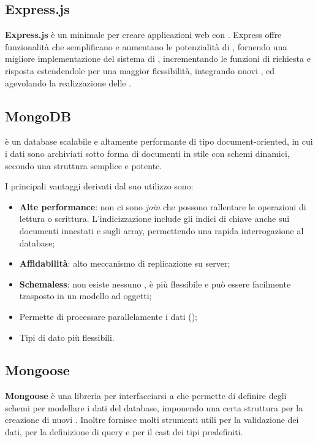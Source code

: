 \subsection{Express.js}
\textbf{Express.js} è un  minimale per creare applicazioni web con . 
Express offre funzionalità che semplificano e aumentano le potenzialità di , fornendo una migliore implementazione del sistema di , incrementando le funzioni di richiesta e risposta estendendole per una maggior flessibilità, integrando nuovi , ed agevolando la realizzazione delle . 

\subsection{MongoDB}
 è un database   scalabile e altamente performante di tipo document-oriented, in cui i dati sono archiviati sotto forma di documenti in stile  con schemi dinamici, secondo una struttura semplice e potente.

I principali vantaggi derivati dal suo utilizzo sono:
\begin{itemize}
	\item \textbf{Alte performance}: non ci sono \emph{join} che possono rallentare le operazioni di lettura o scrittura. L'indicizzazione include gli indici di chiave anche sui documenti innestati e sugli array, permettendo una rapida interrogazione al database;
	\item \textbf{Affidabilità}: alto meccanismo di replicazione su server;
	\item \textbf{Schemaless}: non esiste nessuno , è più flessibile e può essere facilmente trasposto in un modello ad oggetti;
	\item Permette di processare parallelamente i dati ();
	\item Tipi di dato più flessibili.
\end{itemize}

\subsection{Mongoose}
\textbf{Mongoose} è una libreria per interfacciarsi a  che permette di definire degli schemi per modellare i dati del database, imponendo una certa struttura per la creazione di nuovi . Inoltre fornisce molti strumenti utili per la validazione dei dati, per la definizione di query e per il cast dei tipi predefiniti.

